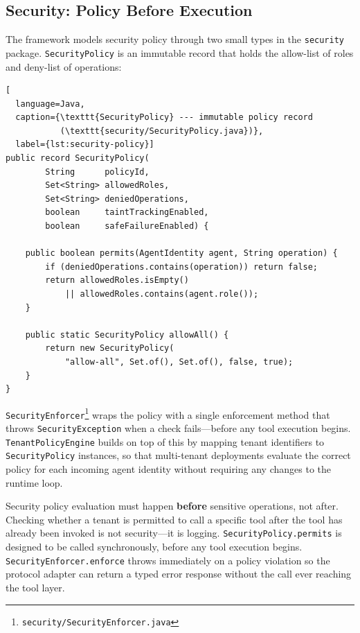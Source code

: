 \subsection{Security: Policy Before Execution}
\label{subsec:security-policy}

The framework models security policy through two small types in the
\lstinline{security} package.  \lstinline{SecurityPolicy} is an
immutable record that holds the allow-list of roles and deny-list of
operations:

\begin{lstlisting}[
  language=Java,
  caption={\texttt{SecurityPolicy} --- immutable policy record
           (\texttt{security/SecurityPolicy.java})},
  label={lst:security-policy}]
public record SecurityPolicy(
        String      policyId,
        Set<String> allowedRoles,
        Set<String> deniedOperations,
        boolean     taintTrackingEnabled,
        boolean     safeFailureEnabled) {

    public boolean permits(AgentIdentity agent, String operation) {
        if (deniedOperations.contains(operation)) return false;
        return allowedRoles.isEmpty()
            || allowedRoles.contains(agent.role());
    }

    public static SecurityPolicy allowAll() {
        return new SecurityPolicy(
            "allow-all", Set.of(), Set.of(), false, true);
    }
}
\end{lstlisting}

\lstinline{SecurityEnforcer}\footnote{\texttt{security/SecurityEnforcer.java}}
wraps the policy with a single enforcement method that throws
\lstinline{SecurityException} when a check fails---before any
tool execution begins.  \lstinline{TenantPolicyEngine} builds on
top of this by mapping tenant identifiers to
\lstinline{SecurityPolicy} instances, so that multi-tenant
deployments evaluate the correct policy for each incoming agent
identity without requiring any changes to the runtime loop.

\begin{warningbox}
Security policy evaluation must happen \textbf{before} sensitive
operations, not after.  Checking whether a tenant is permitted to
call a specific tool after the tool has already been invoked is not
security---it is logging.  \lstinline{SecurityPolicy.permits} is
designed to be called synchronously, before any tool execution
begins.  \lstinline{SecurityEnforcer.enforce} throws immediately on
a policy violation so the protocol adapter can return a typed error
response without the call ever reaching the tool layer.
\end{warningbox}

